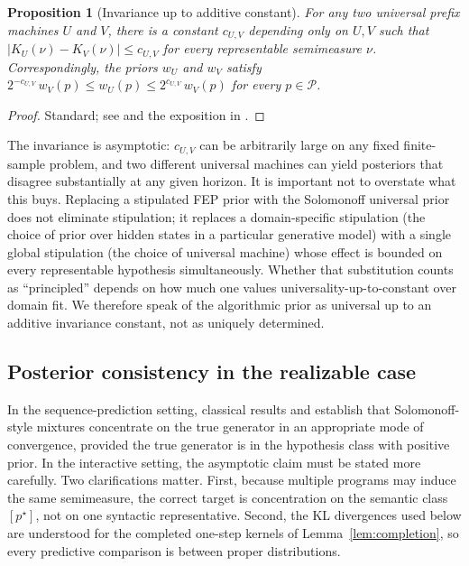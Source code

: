 \documentclass[11pt]{article}
\newtheorem{proposition}[definition]{Proposition}
\theoremstyle{remark}
\newcommand{\Pcal}{\mathcal{P}}
\begin{document}
\begin{proposition}[Invariance up to additive constant]
For any two universal prefix machines \(U\) and \(V\), there is a constant \(c_{U,V}\) depending only on \(U, V\) such that \(|K_U(\nu) - K_V(\nu)| \le c_{U,V}\) for every representable semimeasure \(\nu\). Correspondingly, the priors \(w_U\) and \(w_V\) satisfy \(2^{-c_{U,V}}\,w_V(p) \le w_U(p) \le 2^{c_{U,V}}\,w_V(p)\) for every \(p \in \Pcal\).
\end{proposition}

\begin{proof}
Standard; see \citet{Kolmogorov1965,Chaitin1975} and the exposition in \citet[Chapter 2]{Hutter2005}.
\end{proof}

The invariance is asymptotic: \(c_{U,V}\) can be arbitrarily large on any fixed finite-sample problem, and two different universal machines can yield posteriors that disagree substantially at any given horizon. It is important not to overstate what this buys. Replacing a stipulated FEP prior with the Solomonoff universal prior does not eliminate stipulation; it replaces a domain-specific stipulation (the choice of prior over hidden states in a particular generative model) with a single global stipulation (the choice of universal machine) whose effect is bounded on every representable hypothesis simultaneously. Whether that substitution counts as ``principled'' depends on how much one values universality-up-to-constant over domain fit. We therefore speak of the algorithmic prior as universal up to an additive invariance constant, not as uniquely determined.

\subsection{Posterior consistency in the realizable case}

In the sequence-prediction setting, classical results \citep{BlackwellDubins1962,Leike2016} and \citet[Chapter 3]{Hutter2005} establish that Solomonoff-style mixtures concentrate on the true generator in an appropriate mode of convergence, provided the true generator is in the hypothesis class with positive prior. In the interactive setting, the asymptotic claim must be stated more carefully. Two clarifications matter. First, because multiple programs may induce the same semimeasure, the correct target is concentration on the semantic class \([p^\star]\), not on one syntactic representative. Second, the KL divergences used below are understood for the completed one-step kernels of Lemma~\ref{lem:completion}, so every predictive comparison is between proper distributions.
\end{document}
